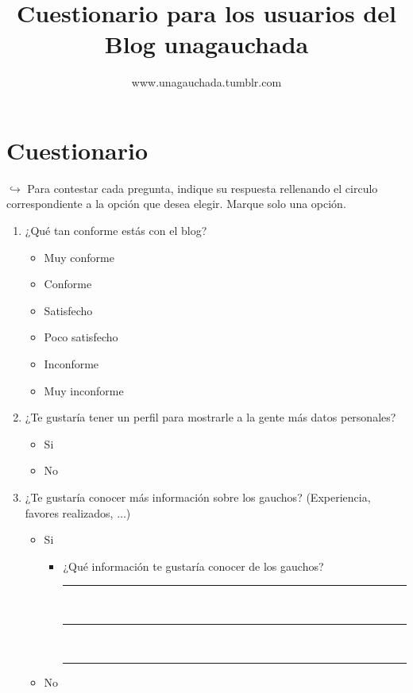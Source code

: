 \documentclass[a4paper,10pt]{article}
\title{Cuestionario para los usuarios del Blog unagauchada}
\author{www.unagauchada.tumblr.com}
\date{}
\begin{document}
\maketitle

\renewcommand{\labelitemi}{$\bigcirc$}

\section{Cuestionario}
$\hookrightarrow{}$ Para contestar cada pregunta, indique su respuesta rellenando el circulo correspondiente a la opción que desea elegir. Marque solo una opción.
\begin{enumerate}
    \item ¿Qué tan conforme estás con el blog?
    \begin{itemize}
        \item Muy conforme
        \item Conforme
        \item Satisfecho
        \item Poco satisfecho
        \item Inconforme
        \item Muy inconforme
    \end{itemize}

    \item ¿Te gustaría tener un perfil para mostrarle a la gente más datos personales?
    \begin{itemize}
        \item Si
        \item No
    \end{itemize}

    \item ¿Te gustaría conocer más información sobre los gauchos? (Experiencia, favores realizados, $\ldots$)
    \begin{itemize}
        \item Si
        \begin{itemize}
            \item ¿Qué información te gustaría conocer de los gauchos?

            \rule{100mm}{0.1mm} \\
            \rule{100mm}{0.1mm} \\
            \rule{100mm}{0.1mm}
        \end{itemize}
        \item No
    \end{itemize}


\end{enumerate}
\end{document}
